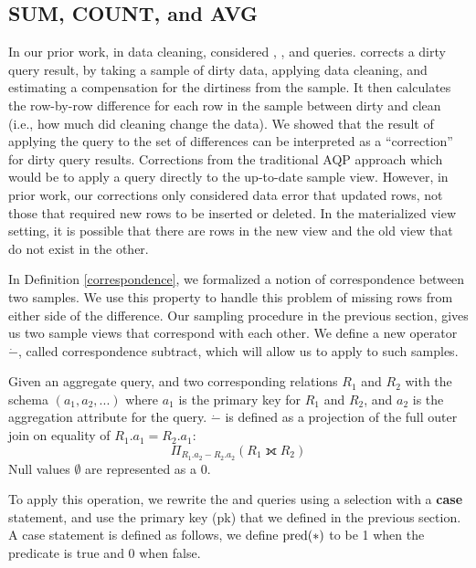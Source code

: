 \subsection{SUM, COUNT, and AVG}
In our prior work, in data cleaning, \nsc considered \sumfunc, \countfunc, and \avgfunc queries.
\nsc corrects a dirty query result, by taking a sample of dirty data, applying data cleaning, and estimating a compensation for the dirtiness from the sample.
It then calculates the row-by-row difference for each row in the sample between dirty and clean (i.e., how much did cleaning change the data).
We showed that the result of applying the query to the set of differences can be interpreted as a ``correction'' for dirty query results. 
Corrections from the traditional AQP approach which would be to apply a query directly to the up-to-date sample view.
However, in prior work, our corrections only considered data error that updated rows, not those that required new rows to be inserted or deleted.
In the materialized view setting, it is possible that there are rows in the new view and the old view that do not exist in the other.

In Definition \ref{correspondence}, we formalized a notion of correspondence between two samples.
We use this property to handle this problem of missing rows from either side of the difference.
Our sampling procedure in the previous section, gives us two sample views that correspond with each other.
We define a new operator $\dot{-}$, called correspondence subtract, which will allow us to apply \nsc to such samples.
\begin{definition} Given an aggregate query, and two corresponding relations $R_1$ and $R_2$ with the schema $(a_1, a_2, ...)$ where $a_1$ is the primary key for $R_1$ and $R_2$, and $a_2$ is the aggregation attribute for the query. 
$\dot{-}$ is defined as a projection of the full outer join on equality of $R_1.a_1 = R_2.a_1$: \[ \Pi_{R_1.a_2 - R_2.a_2} ( R_1 \fullouterjoin R_2 ) \]
Null values $\emptyset$ are represented as a $0$.
\end{definition}
To apply this operation, we rewrite the \sumfunc and \countfunc queries using a selection with a \textbf{case} statement, and use the primary key (pk) that we defined in the previous section.
A case statement is defined as follows, we define $\textrm{pred}(*)$ to be 1 when the predicate is true and 0 when false.


